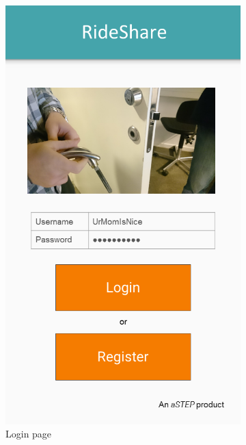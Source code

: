\begin{figure}[h!]
	 \centering
	 \begin{subfigure}[b]{0.3\textwidth}
	 	\includegraphics[width=\textwidth]{figures/GUI-front.png}
	 	\caption{Login page}
	 	\label{fig:GUI-front}
	 \end{subfigure}
	 ~ %
	 \begin{subfigure}[b]{0.3\textwidth}

\end{subfigure}
\end{figure}
